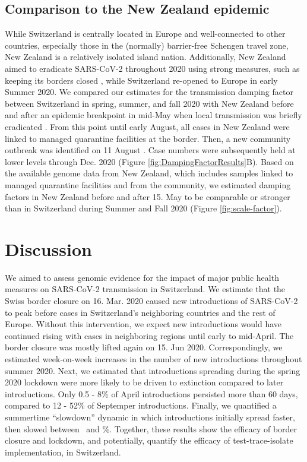 \documentclass[11pt,twoside,lineno]{pnas-new} %
\begin{document}
\subsection{Comparison to the New Zealand epidemic}
While Switzerland is centrally located in Europe and well-connected to other countries, especially those in the (normally) barrier-free Schengen travel zone, New Zealand is a relatively isolated island nation. Additionally, New Zealand aimed to eradicate SARS-CoV-2 throughout 2020 using strong measures, such as keeping its borders closed \cite{ZL-covid-policies}, while Switzerland re-opened to Europe in early Summer 2020. We compared our estimates for the transmission damping factor between Switzerland in spring, summer, and fall 2020 with New Zealand before and after an epidemic breakpoint in mid-May when local transmission was briefly eradicated \cite{Geoghegan2020}. From this point until early August, all cases in New Zealand were linked to managed quarantine facilities at the border. Then, a new community outbreak was identified on 11 August \cite{Geoghegan2021-nzl-outbreak}. Case numbers were subsequently held at lower levels through Dec. 2020 (Figure \ref{fig:DampingFactorResults}B). Based on the available genome data from New Zealand, which includes samples linked to managed quarantine facilities and from the community, we estimated damping factors in New Zealand before and after 15. May to be comparable or stronger than in Switzerland during Summer and Fall 2020 (Figure \ref{fig:scale-factor}).

\section{Discussion}
We aimed to assess genomic evidence for the impact of major public health measures on SARS-CoV-2 transmission in Switzerland. We estimate that the Swiss border closure on 16. Mar. 2020 caused new introductions of SARS-CoV-2 to peak before cases in Switzerland's neighboring countries and the rest of Europe. Without this intervention, we  expect new introductions would have continued rising with cases in neighboring regions until early to mid-April. The border closure was mostly lifted again on 15. Jun 2020. Correspondingly, we estimated week-on-week increases in the number of new introductions throughout summer 2020. Next, we estimated that introductions spreading during the spring 2020 lockdown were more likely to be driven to extinction compared to later introductions. Only 0.5 - 8\% of April introductions persisted more than 60 days, compared to 12 - 52\% of Septemper introductions. Finally, we quantified a summertime ``slowdown'' dynamic in which introductions initially spread faster, then slowed between \summermaxdampingpercentmedianCHEnosampUB\ and \summermindampingpercentmedianCHEnosampUB \%. Together, these results show the efficacy of border closure and lockdown, and potentially, quantify the efficacy of test-trace-isolate implementation, in Switzerland.
\end{document}
